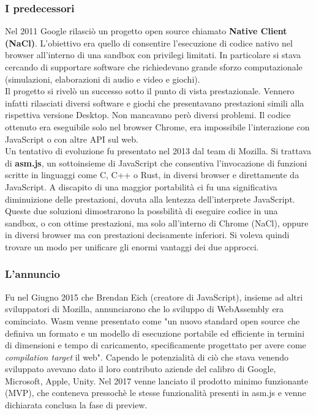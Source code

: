 \subsubsection{I predecessori}
Nel 2011 Google rilasciò un progetto open source chiamato \textbf{Native Client (NaCl)}.
L'obiettivo era quello di consentire l'esecuzione di codice nativo nel browser all'interno di una sandbox con privilegi limitati.
In particolare si stava cercando di supportare software che richiedevano grande sforzo computazionale (simulazioni, elaborazioni di audio e video e giochi).
\\Il progetto si rivelò un successo sotto il punto di vista prestazionale. Vennero infatti rilasciati diversi software e giochi che presentavano prestazioni simili alla rispettiva versione Desktop.
Non mancavano però diversi problemi. Il codice ottenuto era eseguibile solo nel browser Chrome, era impossibile l'interazione con JavaScript o con altre API sul web.
\\Un tentativo di evoluzione fu presentato nel 2013 dal team di Mozilla. Si trattava di \textbf{asm.js}, un sottoinsieme di JavaScript che consentiva l'invocazione di funzioni scritte in linguaggi come C, C++ o Rust, in diversi browser e direttamente da JavaScript.
A discapito di una maggior portabilità ci fu una significativa diminuizione delle prestazioni, dovuta alla lentezza dell'interprete JavaScript.
Queste due soluzioni dimostrarono la possbilità di eseguire codice in una sandbox, o con ottime prestazioni, ma solo all'interno di Chrome (NaCl), oppure in diversi browser ma con prestazioni decisamente inferiori.
Si voleva quindi trovare un modo per unificare gli enormi vantaggi dei due approcci.
\subsubsection{L'annuncio}
Fu nel Giugno 2015 che Brendan Eich (creatore di JavaScript), insieme ad altri sviluppatori di Mozilla, annunciarono che lo sviluppo di WebAssembly era cominciato.
Wasm venne presentato come "un nuovo standard open source che definiva un formato e un modello di esecuzione portabile ed efficiente in termini di dimensioni e tempo di caricamento, specificamente progettato per avere come \emph{compilation target} il web".
Capendo le potenzialità di ciò che stava venendo sviluppato avevano dato il loro contributo aziende del calibro di Google, Microsoft, Apple, Unity.
Nel 2017 venne lanciato il prodotto minimo funzionante (MVP), che conteneva pressochè le stesse funzionalità presenti in asm.js e venne dichiarata conclusa la fase di preview.

